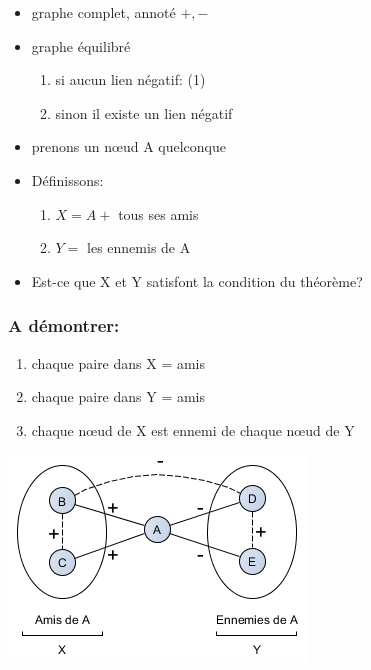 \begin{itemize}\renewcommand\labelitemi{\textbullet}

\item graphe complet, annoté $+,-$

\item graphe équilibré

\begin{enumerate}

\item si aucun lien négatif: (1)

\item sinon il existe un lien négatif

\end{enumerate}

\item prenons un nœud A quelconque

\item Définissons:

\begin{enumerate}

\item $X = A + $ tous ses amis
\item $Y = $ les ennemis de A

\end{enumerate}

\item Est-ce que X et Y satisfont la condition du théorème?
\end{itemize}

\subsubsection*{A démontrer:}


\begin{enumerate}

\item chaque paire dans X = amis

\item chaque paire dans Y = amis

\item chaque nœud de X est ennemi de chaque nœud de Y

\end{enumerate}


\includegraphics[scale=1]{images/22_amis-ennemies.png}

